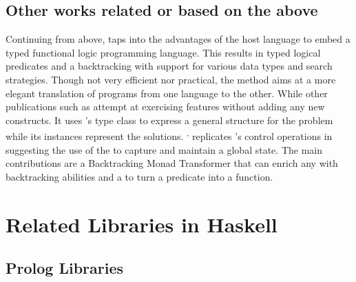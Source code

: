 \documentclass[thesis-solanki.tex]{subfiles}
\begin{document}
\subsection{Other works related or based on the above}


Continuing from above, \cite{claessen2000typed} taps into the advantages of the host language to embed a typed
functional logic programming language.
This results in typed logical predicates and a backtracking  with support for various data
types and search strategies.
Though not very efficient nor practical,
the method aims at a more elegant translation of programs from one language
to the other.
While other publications such as \cite{erwig2004escape} attempt at exercising  features without adding any new 
constructs. 
It uses 's type class to express a general structure for the problem while its instances represent the solutions. 
\textsuperscript{,}
\cite{hinze1998prological} replicates 's control operations in  suggesting the
use of the   to capture and maintain a global state.
The main contributions are a Backtracking Monad Transformer that can enrich any  with
backtracking abilities and a  to turn a  predicate into a
 function.



\section{Related Libraries in Haskell}
\subsection{Prolog Libraries}
\end{document}
